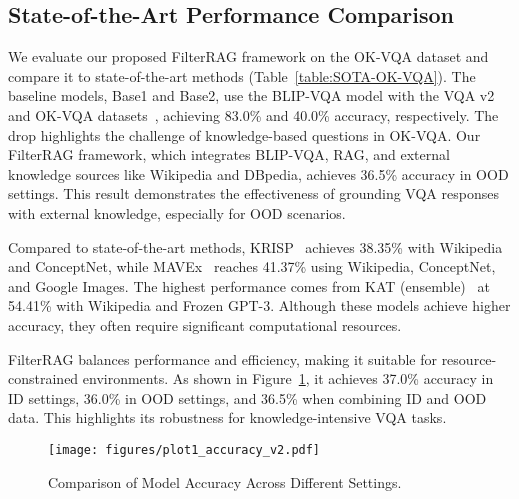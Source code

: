 \subsection{State-of-the-Art Performance Comparison}
We evaluate our proposed FilterRAG framework on the OK-VQA dataset and compare it to state-of-the-art methods (Table~\ref{table:SOTA-OK-VQA}). The baseline models, Base1 and Base2, use the BLIP-VQA model with the VQA v2~\cite{goyal2017making} and OK-VQA datasets~\cite{marino2019ok}, achieving 83.0\% and 40.0\% accuracy, respectively. The drop highlights the challenge of knowledge-based questions in OK-VQA. Our FilterRAG framework, which integrates BLIP-VQA, RAG, and external knowledge sources like Wikipedia and DBpedia, achieves 36.5\% accuracy in OOD settings. This result demonstrates the effectiveness of grounding VQA responses with external knowledge, especially for OOD scenarios. 

Compared to state-of-the-art methods, KRISP~\cite{marino2021krisp}  achieves 38.35\% with Wikipedia and ConceptNet, while MAVEx~\cite{wu2022multi} reaches 41.37\% using Wikipedia, ConceptNet, and Google Images. The highest performance comes from KAT (ensemble)~\cite{gui2021kat} at 54.41\% with Wikipedia and Frozen GPT-3. Although these models achieve higher accuracy, they often require significant computational resources. 

FilterRAG balances performance and efficiency, making it suitable for resource-constrained environments. As shown in Figure~\ref{fig:plot1_accuracy}, it achieves 37.0\% accuracy in ID settings, 36.0\% in OOD settings, and 36.5\% when combining ID and OOD data. This highlights its robustness for knowledge-intensive VQA tasks.

\begin{figure}[h!]
    \centering
    \texttt{[image: figures/plot1\_accuracy\_v2.pdf]}
    \caption{Comparison of Model Accuracy Across Different Settings.}
    \label{fig:plot1_accuracy}
\end{figure}

